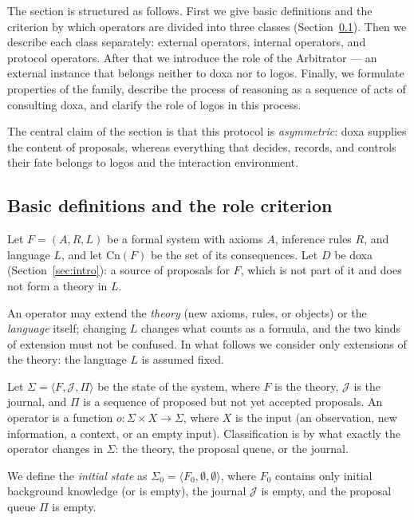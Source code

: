 \documentclass[12pt,a4paper]{article}
\begin{document}
The section is structured as follows. First we give basic definitions and the
criterion by which operators are divided into three classes
(Section~\ref{sec:roles}). Then we describe each class separately: external
operators, internal operators, and protocol operators. After that we introduce
the role of the Arbitrator --- an external instance that belongs neither to
doxa nor to logos. Finally, we formulate properties of the family, describe the
process of reasoning as a sequence of acts of consulting doxa, and clarify the
role of logos in this process.

The central claim of the section is that this protocol is \emph{asymmetric}:
doxa supplies the content of proposals, whereas everything that decides,
records, and controls their fate belongs to logos and the interaction
environment.

\subsection{Basic definitions and the role criterion}
\label{sec:roles}

Let $F = (A, R, L)$ be a formal system with axioms $A$, inference rules $R$,
and language $L$, and let $\mathrm{Cn}(F)$ be the set of its consequences. Let
$D$ be doxa (Section~\ref{sec:intro}): a source of proposals for $F$, which is
not part of it and does not form a theory in $L$.

An operator may extend the \emph{theory} (new axioms, rules, or objects) or
the \emph{language} itself; changing $L$ changes what counts as a formula, and
the two kinds of extension must not be confused. In what follows we consider
only extensions of the theory: the language $L$ is assumed fixed.

Let $\Sigma = \langle F, \mathcal{J}, \Pi \rangle$ be the state of the system,
where $F$ is the theory, $\mathcal{J}$ is the journal, and $\Pi$ is a sequence
of proposed but not yet accepted proposals. An operator is a function
$o: \Sigma \times X \to \Sigma$, where $X$ is the input (an observation, new
information, a context, or an empty input). Classification is by what exactly
the operator changes in $\Sigma$: the theory, the proposal queue, or the
journal.

We define the \emph{initial state} as $\Sigma_0 = \langle F_0, \emptyset,
\emptyset \rangle$, where $F_0$ contains only initial background knowledge
(or is empty), the journal $\mathcal{J}$ is empty, and the proposal queue
$\Pi$ is empty.
\end{document}
